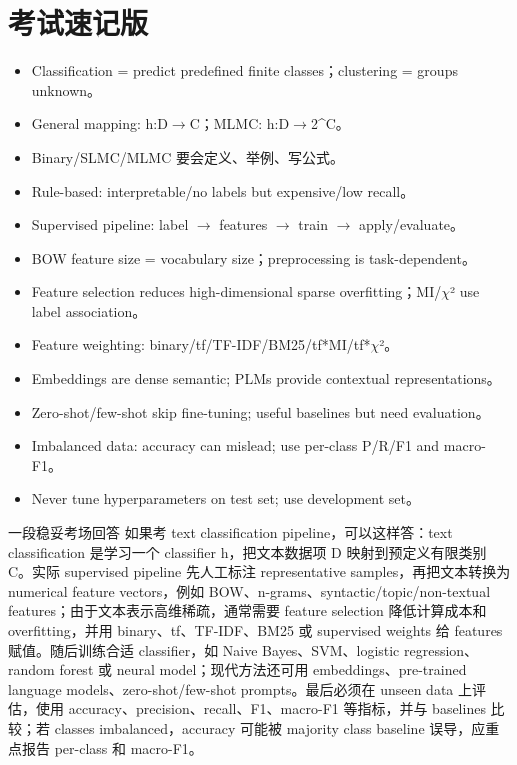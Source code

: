 \documentclass[11pt,a4paper]{ctexart}
\begin{document}
\section{考试速记版}
\begin{itemize}
\item Classification = predict predefined finite classes；clustering = groups unknown。
\item General mapping: h:D\(\rightarrow\)C；MLMC: h:D\(\rightarrow\)2\textasciicircum{}C。
\item Binary/SLMC/MLMC 要会定义、举例、写公式。
\item Rule-based: interpretable/no labels but expensive/low recall。
\item Supervised pipeline: label \(\rightarrow\) features \(\rightarrow\) train \(\rightarrow\) apply/evaluate。
\item BOW feature size = vocabulary size；preprocessing is task-dependent。
\item Feature selection reduces high-dimensional sparse overfitting；MI/\(\chi\)² use label association。
\item Feature weighting: binary/tf/TF-IDF/BM25/tf*MI/tf*\(\chi\)²。
\item Embeddings are dense semantic; PLMs provide contextual representations。
\item Zero-shot/few-shot skip fine-tuning; useful baselines but need evaluation。
\item Imbalanced data: accuracy can mislead; use per-class P/R/F1 and macro-F1。
\item Never tune hyperparameters on test set; use development set。
\end{itemize}
\begin{callout}{一段稳妥考场回答}
如果考 text classification pipeline，可以这样答：text classification 是学习一个 classifier h，把文本数据项 D 映射到预定义有限类别 C。实际 supervised pipeline 先人工标注 representative samples，再把文本转换为 numerical feature vectors，例如 BOW、n-grams、syntactic/topic/non-textual features；由于文本表示高维稀疏，通常需要 feature selection 降低计算成本和 overfitting，并用 binary、tf、TF-IDF、BM25 或 supervised weights 给 features 赋值。随后训练合适 classifier，如 Naive Bayes、SVM、logistic regression、random forest 或 neural model；现代方法还可用 embeddings、pre-trained language models、zero-shot/few-shot prompts。最后必须在 unseen data 上评估，使用 accuracy、precision、recall、F1、macro-F1 等指标，并与 baselines 比较；若 classes imbalanced，accuracy 可能被 majority class baseline 误导，应重点报告 per-class 和 macro-F1。
\end{callout}
\end{document}
